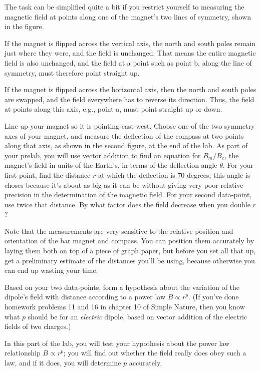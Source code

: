 The task can be simplified quite a bit if you restrict
yourself to measuring the magnetic field at points along one
of the magnet's two lines of symmetry, shown in the figure. 


If the magnet is flipped across the vertical axis, the north
and south poles remain just where they were, and the field
is unchanged. That means the entire magnetic field is also
unchanged, and the field at a point such as point b, along
the line of symmetry, must therefore point straight up.

If the magnet is flipped across the horizontal axis, then
the north and south poles are swapped, and the field
everywhere has to reverse its direction. Thus, the field at
points along this axis, e.g., point a, must point straight up or down.

Line up your magnet so it is pointing east-west. Choose one
of the two symmetry axes of your magnet, and measure the
deflection of the compass at two points along that axis,
as shown in the second figure, at the end of the lab.
As part of your prelab, you will use vector addition to find an equation
for $B_m/B_e$, the magnet's field in units of the Earth's, in terms
of the deflection angle $\theta$. For your first point, find the
distance $r$ at which the deflection is 70 degrees; this angle is choses because
it's about as big as it can be without giving very poor relative precision 
in the determination of the magnetic field. For your second data-point,
use twice that distance. By what factor does the field decrease
when you double $r$?

Note that the measurements are very sensitive to the
relative position and orientation of the bar magnet and
compass. You can position them accurately by laying them
both on top of a piece of graph paper, but before you set all that up,
get a preliminary estimate of the distances you'll be using, because otherwise
you can end up wasting your time.

Based on your two data-points, form a hypothesis about the variation
of the dipole's field with distance according to a power law $B\propto r^p$.
(If you've done homework problems 11 and 16 in chapter 10 of Simple Nature,
then you know what $p$ should be for an \emph{electric} dipole, based on 
vector addition of the electric fields of two charges.)


In this part of the lab, you will test your hypothesis about the power
law relationship $B\propto r^p$; you will find out whether the field really
does obey such a law, and if it does, you will determine $p$ accurately.

